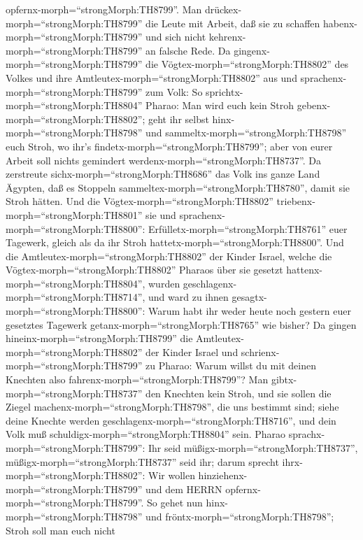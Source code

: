 opfernx-morph=``strongMorph:TH8799''.  Man
drückex-morph=``strongMorph:TH8799'' die Leute mit Arbeit, daß sie zu
schaffen habenx-morph=``strongMorph:TH8799'' und sich nicht
kehrenx-morph=``strongMorph:TH8799'' an falsche Rede.  Da
gingenx-morph=``strongMorph:TH8799'' die
Vögtex-morph=``strongMorph:TH8802'' des Volkes und ihre
Amtleutex-morph=``strongMorph:TH8802'' aus und
sprachenx-morph=``strongMorph:TH8799'' zum Volk: So
sprichtx-morph=``strongMorph:TH8804'' Pharao: Man wird euch kein Stroh
gebenx-morph=``strongMorph:TH8802'';  geht ihr selbst
hinx-morph=``strongMorph:TH8798'' und
sammeltx-morph=``strongMorph:TH8798'' euch Stroh, wo ihr's
findetx-morph=``strongMorph:TH8799''; aber von eurer Arbeit soll nichts
gemindert werdenx-morph=``strongMorph:TH8737''.  Da
zerstreute sichx-morph=``strongMorph:TH8686'' das Volk ins ganze Land
Ägypten, daß es Stoppeln sammeltex-morph=``strongMorph:TH8780'', damit
sie Stroh hätten.  Und die
Vögtex-morph=``strongMorph:TH8802''
triebenx-morph=``strongMorph:TH8801'' sie und
sprachenx-morph=``strongMorph:TH8800'':
Erfülletx-morph=``strongMorph:TH8761'' euer Tagewerk, gleich als da ihr
Stroh hattetx-morph=``strongMorph:TH8800''.  Und die
Amtleutex-morph=``strongMorph:TH8802'' der Kinder Israel, welche die
Vögtex-morph=``strongMorph:TH8802'' Pharaos über sie gesetzt
hattenx-morph=``strongMorph:TH8804'', wurden
geschlagenx-morph=``strongMorph:TH8714'', und ward zu ihnen
gesagtx-morph=``strongMorph:TH8800'': Warum habt ihr weder heute noch
gestern euer gesetztes Tagewerk getanx-morph=``strongMorph:TH8765'' wie
bisher?  Da gingen hineinx-morph=``strongMorph:TH8799'' die
Amtleutex-morph=``strongMorph:TH8802'' der Kinder Israel und
schrienx-morph=``strongMorph:TH8799'' zu Pharao: Warum willst du mit
deinen Knechten also fahrenx-morph=``strongMorph:TH8799''? 
Man gibtx-morph=``strongMorph:TH8737'' den Knechten kein Stroh, und sie
sollen die Ziegel machenx-morph=``strongMorph:TH8798'', die uns bestimmt
sind; siehe deine Knechte werden
geschlagenx-morph=``strongMorph:TH8716'', und dein Volk muß
schuldigx-morph=``strongMorph:TH8804'' sein.  Pharao
sprachx-morph=``strongMorph:TH8799'': Ihr seid
müßigx-morph=``strongMorph:TH8737'', müßigx-morph=``strongMorph:TH8737''
seid ihr; darum sprecht ihrx-morph=``strongMorph:TH8802'': Wir wollen
hinziehenx-morph=``strongMorph:TH8799'' und dem HERRN
opfernx-morph=``strongMorph:TH8799''.  So gehet nun
hinx-morph=``strongMorph:TH8798'' und
fröntx-morph=``strongMorph:TH8798''; Stroh soll man euch nicht
